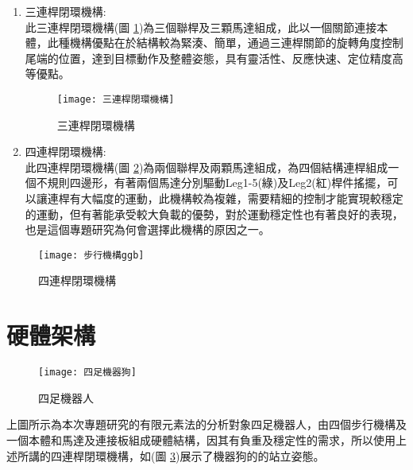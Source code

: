 \begin{enumerate}
\item 三連桿閉環機構:\\

此三連桿閉環機構(圖 \ref{三連桿閉環機構})為三個聯桿及三顆馬達組成，此以一個關節連接本體，此種機構優點在於結構較為緊湊、簡單，通過三連桿關節的旋轉角度控制尾端的位置，達到目標動作及整體姿態，具有靈活性、反應快速、定位精度高等優點。\

\begin{figure}[hbt!]
\begin{center}
\texttt{[image: 三連桿閉環機構]}
\caption{\Large 三連桿閉環機構}\label{三連桿閉環機構}
\end{center}
\end{figure}
\newpage

\item 四連桿閉環機構:\\

此四連桿閉環機構(圖 \ref{步行機構ggb})為兩個聯桿及兩顆馬達組成，為四個結構連桿組成一個不規則四邊形，有著兩個馬達分別驅動Leg1-5(綠)及Leg2(紅)桿件搖擺，可以讓連桿有大幅度的運動，此機構較為複雜，需要精細的控制才能實現較穩定的運動，但有著能承受較大負載的優勢，對於運動穩定性也有著良好的表現，也是這個專題研究為何會選擇此機構的原因之一。
\end{enumerate}

\begin{figure}[hbt!]
\begin{center}
\texttt{[image: 步行機構ggb]}
\caption{\Large 四連桿閉環機構}\label{步行機構ggb}
\end{center}
\end{figure}
\newpage

\section{硬體架構}
\begin{figure}[hbtp]
\begin{center}
\texttt{[image: 四足機器狗]}
\caption{\Large 四足機器人}\label{四足機器狗}
\end{center}
\end{figure}

上圖所示為本次專題研究的有限元素法的分析對象四足機器人，由四個步行機構及一個本體和馬達及連接板組成硬體結構，因其有負重及穩定性的需求，所以使用上述所講的四連桿閉環機構，如(圖 \ref{四足機器狗})展示了機器狗的的站立姿態。\
\newpage

